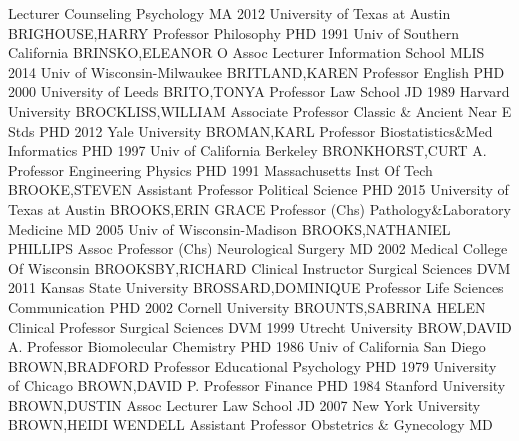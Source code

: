 \documentclass[
]{article}
\begin{document}
\textbar Lecturer \textbar Counseling Psychology \textbar{} 
\textbar MA 2012 University of Texas at Austin \textbar BRIGHOUSE,HARRY
\textbar Professor \textbar Philosophy \textbar{} 
\textbar PHD 1991 Univ of Southern California \textbar BRINSKO,ELEANOR O
\textbar Assoc Lecturer \textbar Information School \textbar{}
 \textbar MLIS 2014 Univ of Wisconsin-Milwaukee
\textbar BRITLAND,KAREN \textbar Professor \textbar English \textbar{}
 \textbar PHD 2000 University of Leeds \textbar BRITO,TONYA
\textbar Professor \textbar Law School \textbar{} 
\textbar JD 1989 Harvard University \textbar BROCKLISS,WILLIAM
\textbar Associate Professor \textbar Classic \& Ancient Near E Stds
\textbar{}  \textbar PHD 2012 Yale University
\textbar BROMAN,KARL \textbar Professor \textbar Biostatistics\&Med
Informatics \textbar{}  \textbar PHD 1997 Univ of California
Berkeley \textbar BRONKHORST,CURT A. \textbar Professor
\textbar Engineering Physics \textbar{}  \textbar PHD 1991
Massachusetts Inst Of Tech \textbar BROOKE,STEVEN \textbar Assistant
Professor \textbar Political Science \textbar{}  \textbar PHD
2015 University of Texas at Austin \textbar BROOKS,ERIN GRACE
\textbar Professor (Chs) \textbar Pathology\&Laboratory Medicine
\textbar{}  \textbar MD 2005 Univ of Wisconsin-Madison
\textbar BROOKS,NATHANIEL PHILLIPS \textbar Assoc Professor (Chs)
\textbar Neurological Surgery \textbar{}  \textbar MD 2002
Medical College Of Wisconsin \textbar BROOKSBY,RICHARD \textbar Clinical
Instructor \textbar Surgical Sciences \textbar{} 
\textbar DVM 2011 Kansas State University \textbar BROSSARD,DOMINIQUE
\textbar Professor \textbar Life Sciences Communication \textbar{}
 \textbar PHD 2002 Cornell University
\textbar BROUNTS,SABRINA HELEN \textbar Clinical Professor
\textbar Surgical Sciences \textbar{}  \textbar DVM 1999
Utrecht University \textbar BROW,DAVID A. \textbar Professor
\textbar Biomolecular Chemistry \textbar{}  \textbar PHD 1986
Univ of California San Diego \textbar BROWN,BRADFORD \textbar Professor
\textbar Educational Psychology \textbar{}  \textbar PHD 1979
University of Chicago \textbar BROWN,DAVID P. \textbar Professor
\textbar Finance \textbar{}  \textbar PHD 1984 Stanford
University \textbar BROWN,DUSTIN \textbar Assoc Lecturer \textbar Law
School \textbar{}  \textbar JD 2007 New York University
\textbar BROWN,HEIDI WENDELL \textbar Assistant Professor
\textbar Obstetrics \& Gynecology \textbar{}  \textbar MD
\end{document}
